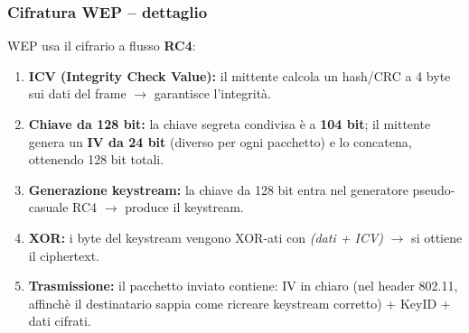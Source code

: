\documentclass[a4paper,12pt]{report}
\begin{document}
\newpage
\subsubsection{Cifratura WEP -- dettaglio}

WEP usa il cifrario a flusso \textbf{RC4}:

\begin{center}
\end{center}

\begin{tcolorbox}[defbox, title=Processo di cifratura WEP (passo per passo)]
\begin{enumerate}[noitemsep]
  \item \textbf{ICV (Integrity Check Value):} il mittente calcola un hash/CRC
        a 4 byte sui dati del frame $\to$ garantisce l'integrit\`a.
  \item \textbf{Chiave da 128 bit:} la chiave segreta condivisa \`e a \textbf{104 bit};
        il mittente genera un \textbf{IV da 24 bit} (diverso per ogni pacchetto)
        e lo concatena, ottenendo 128 bit totali.
  \item \textbf{Generazione keystream:} la chiave da 128 bit entra nel generatore
        pseudo-casuale RC4 $\to$ produce il keystream.
  \item \textbf{XOR:} i byte del keystream vengono XOR-ati con \emph{(dati + ICV)}
        $\to$ si ottiene il ciphertext.
  \item \textbf{Trasmissione:} il pacchetto inviato contiene:
        IV in chiaro (nel header 802.11, affinchè il destinatario sappia come ricreare keystream corretto) + KeyID + dati cifrati.
\end{enumerate}
\end{tcolorbox}
\end{document}
